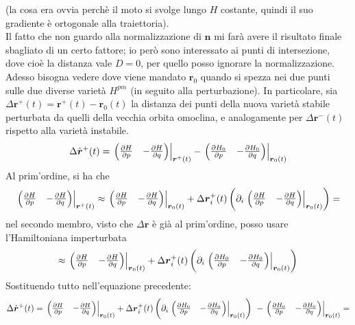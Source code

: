 \documentclass[a4paper,12pt]{article}
\theoremstyle{plain}
\renewcommand{\vec}[1]{{\boldsymbol{#1}}}
\theoremstyle{definition}
\newcommand{\rpos}{\vec{r}}
\theoremstyle{remark}
\begin{document}
(la cosa era ovvia perchè il moto si svolge lungo $H$ costante, quindi il suo gradiente è ortogonale alla traiettoria).
\\Il fatto che non guardo alla normalizzazione di $\vec{n}$ mi farà avere il risultato finale sbagliato di un certo fattore; io però sono interessato ai punti di intersezione, dove cioè la distanza vale $D=0$, per quello posso ignorare la normalizzazione.\\
Adesso bisogna vedere dove viene mandato $\vec{r}_0$ quando si spezza nei due punti sulle due diverse varietà $H^{pm}$ (in seguito alla perturbazione).
In particolare, sia $\Delta \vec{r}^+(t)=\vec{r}^+(t)-\vec{r}_0(t)$ la distanza dei punti della nuova varietà stabile perturbata da quelli della vecchia orbita omoclina, e analogamente per $\Delta \vec{r}^-(t)$ rispetto alla varietà instabile.
\[\Delta\dot{\vec{r}}^+(t)=\left.\begin{pmatrix}
\pdv{H}{p}&
-\pdv{H}{q}
\end{pmatrix}	\right|_{\vec{r}^+(t)}	-\left.\begin{pmatrix}
\pdv{H_0}{p}&
-\pdv{H_0}{q}\end{pmatrix}\right|_{\vec{r}_0(t)}
			\]
Al prim'ordine, si ha che 
\[\left.\begin{pmatrix}
\pdv{H}{p}&
-\pdv{H}{q}
\end{pmatrix}	\right|_{\vec{r}^+(t)}	\approx	\left.\begin{pmatrix}
\pdv{H}{p}&
-\pdv{H}{q}
\end{pmatrix}	\right|_{\vec{r}_0(t)}+\Delta \vec{r}^+_i(t)\left(\partial_i\left.\begin{pmatrix}
\pdv{H}{p}&
-\pdv{H}{q}
\end{pmatrix}	\right|_{\vec{r}_0(t)}			\right)=\]
nel secondo membro, visto che $\Delta \rpos$ è già al prim'ordine, posso usare l'Hamiltoniana imperturbata
\[\approx\left.\begin{pmatrix}
\pdv{H}{p}&
-\pdv{H}{q}
\end{pmatrix}	\right|_{\vec{r}_0(t)}+\Delta \vec{r}^+_i(t)\left(\partial_i\left.\begin{pmatrix}
\pdv{H_0}{p}&
-\pdv{H_0}{q}
\end{pmatrix}	\right|_{\vec{r}_0(t)}			\right)\]
Sostituendo tutto nell'equazione precedente:
\[\Delta\dot{\vec{r}}^+(t)=\left.\begin{pmatrix}
\pdv{H}{p}&
-\pdv{H}{q}
\end{pmatrix}	\right|_{\vec{r}_0(t)}+\Delta \vec{r}^+_i(t)\left(\partial_i\left.\begin{pmatrix}
\pdv{H_0}{p}&
-\pdv{H_0}{q}
\end{pmatrix}	\right|_{\vec{r}_0(t)}			\right)\	-\left.\begin{pmatrix}
\pdv{H_0}{p}&
-\pdv{H_0}{q}\end{pmatrix}\right|_{\vec{r}_0(t)}=
\]
\end{document}
